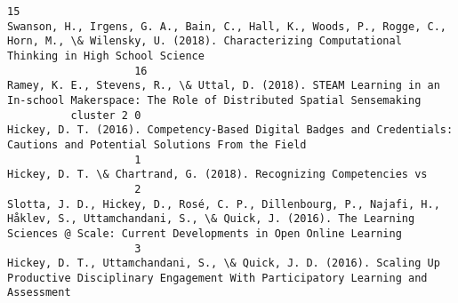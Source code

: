 \documentclass[journal,twocolumn]{IEEEtran}
\begin{document}
\begin{Verbatim}[commandchars=\\\{\}]
                    15                                                                                                                                                                                                                                                          Swanson, H., Irgens, G. A., Bain, C., Hall, K., Woods, P., Rogge, C., Horn, M., \& Wilensky, U. (2018). Characterizing Computational Thinking in High School Science
                    16                                                                                                                                                                                                                                                                                        Ramey, K. E., Stevens, R., \& Uttal, D. (2018). STEAM Learning in an In-school Makerspace: The Role of Distributed Spatial Sensemaking
          cluster 2 0                                                                                                                                                                                                                                                                                                       Hickey, D. T. (2016). Competency-Based Digital Badges and Credentials: Cautions and Potential Solutions From the Field 
                    1                                                                                                                                                                                                                                                                                                                                                             Hickey, D. T. \& Chartrand, G. (2018). Recognizing Competencies vs
                    2                                                                                                                                                                                                                          Slotta, J. D., Hickey, D., Rosé, C. P., Dillenbourg, P., Najafi, H., Håklev, S., Uttamchandani, S., \& Quick, J. (2016). The Learning Sciences @ Scale: Current Developments in Open Online Learning 
                    3                                                                                                                                                                                                                                                                            Hickey, D. T., Uttamchandani, S., \& Quick, J. D. (2016). Scaling Up Productive Disciplinary Engagement With Participatory Learning and Assessment 

\end{Verbatim}
\end{document}
